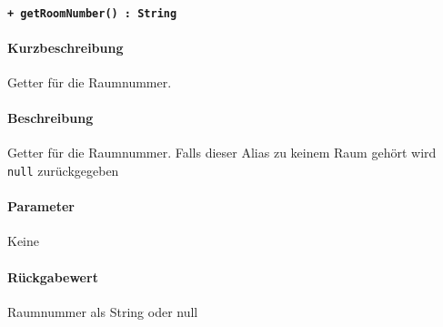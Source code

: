 \paragraph{\texttt{+ getRoomNumber() : String}}%
\paragraph*{Kurzbeschreibung}
Getter für die Raumnummer.
\paragraph*{Beschreibung}
Getter für die Raumnummer.
Falls dieser Alias zu keinem Raum gehört wird \verb#null# zurückgegeben
\paragraph*{Parameter}
Keine
\paragraph*{Rückgabewert}
Raumnummer als String oder null